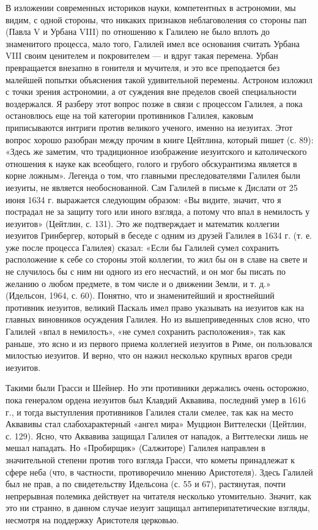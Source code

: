 В изложении современных историков науки, компетентных в астрономии, мы видим, с
одной стороны, что никаких признаков неблаговоления со стороны пап (Павла V и
Урбана VIII) по отношению к Галилею не было вплоть до знаменитого процесса,
мало того, Галилей имел все основания считать Урбана VIII своим ценителем и
покровителем --- и вдруг такая перемена. Урбан превращается внезапно в гонителя и
мучителя, и это все преподается без малейшей попытки объяснения такой
удивительной перемены. Астроном изложил с точки зрения астрономии, а от
суждения вне пределов своей специальности воздержался. Я разберу этот вопрос
позже в связи с процессом Галилея, а пока остановлюсь еще на той категории
противников Галилея, каковым приписываются интриги против великого ученого,
именно на иезуитах. Этот вопрос хорошо разобран между прочим в книге Цейтлина,
который пишет (с. 89): «Здесь же заметим, что традиционное изображение
иезуитского и католического отношения к науке как всеобщего, голого и грубого
обскурантизма является в корне ложным». Легенда о том, что главными
преследователями Галилея были иезуиты, не является необоснованной. Сам Галилей
в письме к Дислати от 25 июня 1634 г. выражается следующим образом: «Вы видите,
значит, что я пострадал не за защиту того или иного взгляда, а потому что впал
в немилость у иезуитов» (Цейтлин, с. 131). Это же подтверждает и математик
коллегии иезуитов Гринбергер, который в беседе с одним из друзей Галилея в 1634
г. (т. е. уже после процесса Галилея) сказал: «Если бы Галилей сумел сохранить
расположение к себе со стороны этой коллегии, то жил бы он в славе на свете и
не случилось бы с ним ни одного из его несчастий, и он мог бы писать по желанию
о любом предмете, в том числе и о движении Земли, и т. д.» (Идельсон, 1964, с.
60). Понятно, что и знаменитейший и яростнейший противник иезуитов, великий
Паскаль имел право указывать на иезуитов как на главных виновников осуждения
Галилея. Но из вышеприведенных слов ясно, что Галилей «впал в немилость», «не
сумел сохранить расположения», так как раньше, это ясно и из первого приема
коллегией иезуитов в Риме, он пользовался милостью иезуитов. И верно, что он
нажил несколько крупных врагов среди иезуитов.

Такими были Грасси и Шейнер. Но эти противники держались очень осторожно, пока
генералом ордена иезуитов был Клавдий Аквавива, последний умер в 1616 г., и
тогда выступления противников Галилея стали смелее, так как на место Аквавивы
стал слабохарактерный «ангел мира» Муццион Виттелески (Цейтлин, с. 129). Ясно,
что Аквавива защищал Галилея от нападок, а Виттелески лишь не мешал нападать.
Но «Пробирщик» (Салжиторе) Галилея направлен в значительной степени против того
взгляда Грасси, что кометы принадлежат к сфере неба (что, в частности,
противоречило мнению Аристотеля). Здесь Галилей был не прав, а по свидетельству
Идельсона (с. 55 и 67), растянутая, почти непрерывная полемика действует на
читателя несколько утомительно. Значит, как это ни странно, в данном случае
иезуит защищал антиперипатетические взгляды, несмотря на поддержку Аристотеля
церковью.


